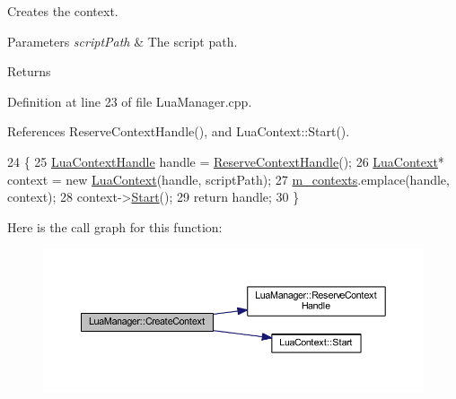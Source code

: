 Creates the context. 


\begin{DoxyParams}{Parameters}
{\em script\+Path} & The script path.\\
\hline
\end{DoxyParams}
\begin{DoxyReturn}{Returns}

\end{DoxyReturn}


Definition at line 23 of file Lua\+Manager.\+cpp.



References Reserve\+Context\+Handle(), and Lua\+Context\+::\+Start().


\begin{DoxyCode}
24 \{
25   \hyperlink{_lua_context_8h_a2ffcc2d3ed21165072a1d7b61259bf14}{LuaContextHandle} handle = \hyperlink{class_lua_manager_a0e01a877be1de2604b4f9cd8ce9f4ac4}{ReserveContextHandle}();
26   \hyperlink{class_lua_context}{LuaContext}* context = \textcolor{keyword}{new} \hyperlink{class_lua_context}{LuaContext}(handle, scriptPath);
27   \hyperlink{class_lua_manager_a38776ab77e2724c0ea549be44087ab98}{m\_contexts}.emplace(handle, context);
28   context->\hyperlink{class_lua_context_a9a21dfe0dc89a3611eb13a7470a87acf}{Start}();
29   \textcolor{keywordflow}{return} handle;
30 \}
\end{DoxyCode}


Here is the call graph for this function\+:
\nopagebreak
\begin{figure}[H]
\begin{center}
\leavevmode
\includegraphics[width=350pt]{class_lua_manager_a8b465c53f9998ea1d13f7b7242143395_cgraph}
\end{center}
\end{figure}


